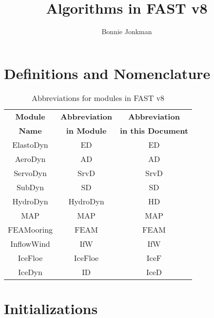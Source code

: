 \documentclass[10pt,letterpaper,oneside,notitlepage]{article}
\begin{document}
\title{Algorithms in FAST v8}
\author{Bonnie Jonkman}
\maketitle


\section{Definitions and Nomenclature}


\begin{table}[h]
	\centering
		\begin{tabular}{c|c|c}
		\textbf{Module} & \textbf{Abbreviation} & \textbf{Abbreviation}\\
		\textbf{Name}   & \textbf{in Module}    & \textbf{in this Document}\\
		\hline 
		ElastoDyn       & ED                    & ED        \\
		AeroDyn         & AD                    & AD        \\
		ServoDyn        & SrvD                  & SrvD      \\
		SubDyn          & SD                    & SD        \\
		HydroDyn        & HydroDyn              & HD        \\
		MAP             & MAP                   & MAP       \\
		FEAMooring      & FEAM                  & FEAM      \\
		InflowWind      & IfW                   & IfW       \\   
		IceFloe         & IceFloe               & IceF      \\   
		IceDyn          & ID                    & IceD      \\   
		\end{tabular}
	\caption{Abbreviations for modules in FAST v8}
	\label{tab:Abbrev}
\end{table}


\printnomenclature

\section{Initializations}
\end{document}
